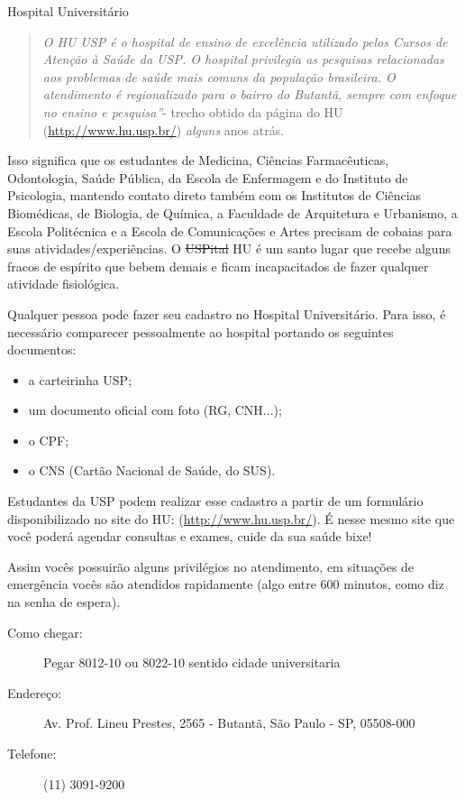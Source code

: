 \begin{secao}{Hospital Universitário}
   \begin{quote}\emph{O HU USP é o hospital de ensino de excelência utilizado
pelos Cursos de Atenção à Saúde da USP.  O hospital privilegia as pesquisas
relacionadas aos problemas de saúde  mais comuns da população brasileira. O
atendimento é regionalizado para o bairro do Butantã, sempre com enfoque no
ensino e pesquisa''}- trecho obtido da página do HU (\url{http://www.hu.usp.br/})
\textit{alguns} anos atrás.
   \end{quote}

Isso significa que os estudantes de Medicina, Ciências Farmacêuticas,
Odontologia, Saúde Pública, da Escola de Enfermagem e do Instituto de
Psicologia, mantendo contato direto também com os Institutos de Ciências
Biomédicas, de Biologia, de Química, a Faculdade de Arquitetura e Urbanismo,
a Escola Politécnica e a Escola de Comunicações e Artes precisam de cobaias para
suas atividades/experiências. O \sout{USPital} HU é um santo lugar que recebe alguns 
fracos de espírito que bebem demais e ficam incapacitados de fazer qualquer 
atividade fisiológica. 

Qualquer pessoa pode fazer seu cadastro no Hospital Universitário. Para isso, é 
necessário comparecer pessoalmente ao hospital portando os seguintes documentos:

\begin{itemize}
   \item a carteirinha USP;
   \item um documento oficial com foto (RG, CNH...);
   \item o CPF;
   \item o CNS (Cartão Nacional de Saúde, do SUS).
\end{itemize}

Estudantes da USP podem realizar esse cadastro a partir de um formulário 
disponibilizado no site do HU: (\url{http://www.hu.usp.br/}). É nesse mesmo site 
que você poderá agendar consultas e exames, cuide da sua saúde bixe!

Assim vocês possuirão alguns privilégios no atendimento, em situações de
emergência vocês são atendidos rapidamente (algo entre 600 minutos, como
diz na senha de espera). %

\begin{description}
\item [Como chegar:] Pegar 8012-10 ou 8022-10 sentido cidade universitaria
\item [Endereço:] Av. Prof. Lineu Prestes, 2565 - Butantã, São Paulo - SP, 05508-000
\item [Telefone:] (11) 3091-9200
\end{description}


\end{secao}
